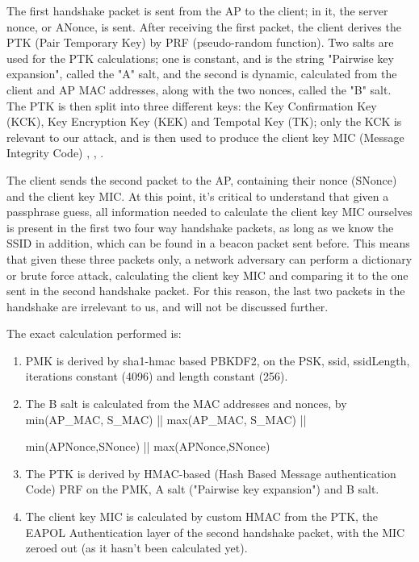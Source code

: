 \documentclass[sigconf]{acmart}
\begin{document}
The first handshake packet is sent from the AP to the client; in it, the server nonce, or ANonce, is sent. After receiving the first packet, the client derives the PTK (Pair Temporary Key) by PRF (pseudo-random function). Two salts are used for the PTK calculations; one is constant, and is the string "Pairwise key expansion", called the "A" salt, and the second is dynamic, calculated from the client and AP MAC addresses, along with the two nonces, called the "B" salt.
The PTK is then split into three different keys: the Key Confirmation Key (KCK), Key Encryption Key (KEK)
and Tempotal Key (TK); only the KCK is relevant to our attack, and 
is then used to produce the client key MIC (Message Integrity Code) \cite{alhamry2022exploring}, \cite{abo2017study}, \cite{arana2006benefits}. 

The client sends the second packet to the AP, containing their nonce (SNonce) and the client key MIC. At this point, it's critical to understand that given a passphrase guess, all information needed to calculate the client key MIC ourselves is present in the first two four way handshake packets, as long as we know the SSID in addition, which can be found in a beacon packet sent before. This means that given these three packets only, a network adversary can perform a dictionary or brute force attack, calculating the client key MIC and comparing it to the one sent in the second handshake packet. For this reason, the last two packets in the handshake are irrelevant to us, and will not be discussed further.

The exact calculation performed is:
\begin{enumerate}
\item  PMK is derived by sha1-hmac based PBKDF2, on the PSK, ssid, ssidLength, iterations constant (4096) and length constant (256).
\item  The B salt is calculated from the MAC addresses and nonces, by min(AP\_MAC, S\_MAC) || max(AP\_MAC, S\_MAC) || 

min(APNonce,SNonce) || max(APNonce,SNonce)
\item The PTK is derived by HMAC-based (Hash Based Message authentication Code) PRF on the PMK, A salt ("Pairwise key expansion") and B salt.
\item The client key MIC is calculated by custom HMAC from the PTK, the EAPOL Authentication layer of the second handshake packet, with the MIC zeroed out (as it hasn't been calculated yet).
\end{enumerate}
\end{document}
